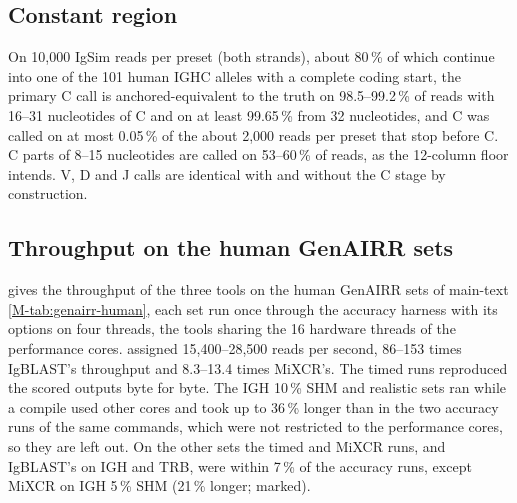 \documentclass[11pt,a4paper]{article}
\begin{document}
\subsection{Constant region}
\label{sec:constant-results}

On 10,000 IgSim reads per preset (both strands), about 80\,\% of which
continue into one of the 101 human IGHC alleles with a complete coding
start, the primary C call
is anchored-equivalent to the truth on 98.5--99.2\,\% of reads with 16--31
nucleotides of C and on at least 99.65\,\% from 32 nucleotides, and C was
called on at most 0.05\,\% of the about 2,000 reads per preset that stop
before C. C parts of 8--15 nucleotides are called on 53--60\,\% of reads, as
the 12-column floor intends. V, D and J calls are identical with and
without the C stage by construction.

\subsection{Throughput on the human GenAIRR sets}
\label{sec:genairr-speed}

 gives the throughput of the three tools on the
human GenAIRR sets of main-text \cref{M-tab:genairr-human}, each set run once
through the accuracy harness with its options on four threads, the tools
sharing the 16 hardware threads of the performance cores. \swig{} assigned
15,400--28,500 reads per second, 86--153 times IgBLAST's throughput and
8.3--13.4 times MiXCR's. The timed runs reproduced the scored outputs byte
for byte. The IGH 10\,\% SHM and realistic sets ran while a compile used
other cores and took up to 36\,\% longer than in the two accuracy runs of the
same commands, which were not restricted to the performance cores, so they
are left out. On the other sets the timed \swig{} and MiXCR runs, and
IgBLAST's on IGH and TRB, were within 7\,\% of the accuracy runs, except
MiXCR on IGH 5\,\% SHM (21\,\% longer; marked).
\end{document}
